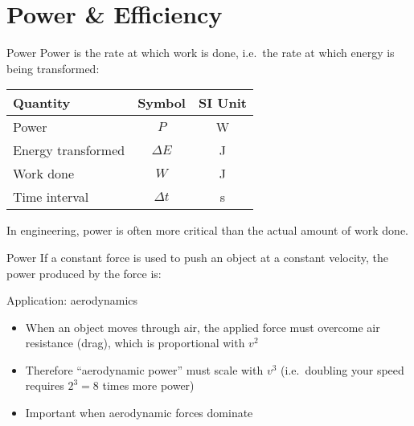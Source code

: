 \documentclass[12pt,compress,aspectratio=169]{beamer}
\begin{document}
\section{Power \& Efficiency}

\begin{frame}{Power}
  Power is the rate at which work is done, i.e.\ the rate at which energy is
  being transformed:

  \begin{center}
    \begin{tabular}{l|c|c}
      \rowcolor{pink}
      \textbf{Quantity}  & \textbf{Symbol} & \textbf{SI Unit} \\ \hline
      Power              & $P$        & \si\watt \\
      Energy transformed & $\Delta E$ & \si\joule \\
      Work done          & $W$        & \si\joule \\
      Time interval      & $\Delta t$ & \si\second
    \end{tabular}
  \end{center}
  In engineering, power is often more critical than the actual amount of work
  done.
\end{frame}



\begin{frame}{Power}
  If a constant force is used to push an object at a constant velocity, the
  power produced by the force is:
  
  
  Application: aerodynamics
  \begin{itemize}
  \item When an object moves through air, the applied force must overcome air
    resistance (drag), which is proportional with $v^2$
    \item Therefore ``aerodynamic power'' must scale with $v^3$ (i.e.\ doubling
      your speed requires $2^3=8$ times more power)
    \item Important when aerodynamic forces dominate
  \end{itemize}
\end{frame}
\end{document}
